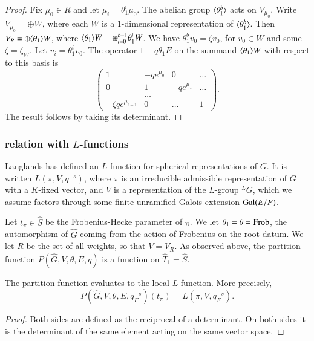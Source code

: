 \begin{proof} Fix $\mu_0\in R$ and let $\mu_i = \theta_1^i \mu_0$.
  The abelian group $\langle{\theta_1^b}\rangle$ acts on $V_{\mu_0}$.  Write
  $V_{\mu_0} = \oplus W$, where each $W$ is a $1$-dimensional
  representation of $\langle{\theta_1^b}\rangle$.  Then $V_R = \oplus
  \langle{\theta_1}\rangle W$, where $\langle{\theta_1}\rangle W = \oplus_{i=0}^{b-1}
  \theta_1^i W$.  We have $\theta_1^b v_0 = \zeta v_0$, for $v_0\in W$
  and some $\zeta = \zeta_W$.  Let $v_i = \theta_1^i v_0$.  The
  operator $1 - q \theta_1 E$ on the summand $\langle{\theta_1}\rangle W$ with
  respect to this basis is
\[
\begin{pmatrix}
1 & -q e^{\mu_0} & 0 & \ldots\\
0 & 1 & -q e^{\mu_1} & \ldots\\
   & \ldots & & \\
-\zeta  q e^{\mu_{b-1}} & 0 & \ldots & 1
\end{pmatrix}.
\]
The result follows by taking its determinant.
\end{proof}

\subsubsection{relation with $L$-functions}

Langlands has defined an $L$-function for spherical representations of
$G$.  It is written $L(\pi,V,q^{-s})$, where $\pi$ is an irreducible
admissible representation of $G$ with a $K$-fixed vector, and $V$ is a
representation of the $L$-group ${}^LG$, which we assume factors
through some finite unramified Galois extension ${\operatorname{Gal}}(E/F)$.

Let $t_\pi\in \hat S$ be the Frobenius-Hecke parameter of $\pi$.  We
let $\theta_1 = \theta = {\operatorname{Frob}}$, the automorphism of $\hat G$ coming
from the action of Frobenius on the root datum.  We let $R$ be the set
of all weights, so that $V = V_R$.  As observed above, the partition
function $P(\hat G,V,\theta,E,q)$ is a function on $\hat T_1 = \hat
S$.  

\begin{lemma} 
  The partition function evaluates to the local $L$-function.  More
  precisely,
\[
P(\hat G,V,\theta,E,q_F^{-s})(t_\pi) = L(\pi,V,q_F^{-s}).
\]
\end{lemma}

\begin{proof} Both sides are defined as the reciprocal of a
  determinant.  On both sides it is the determinant of the same
  element acting on the same vector space.
\end{proof}

